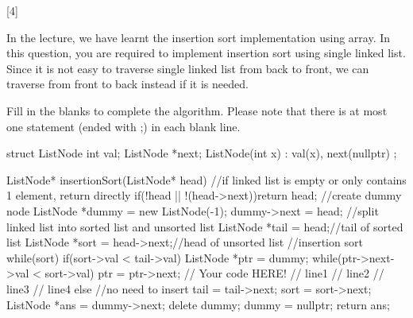 [4]

In the lecture, we have learnt the insertion sort implementation using array. In this question, you are required to implement insertion sort using single linked list. Since it is not easy to traverse single linked list from back to front, we can traverse from front to back instead if it is needed.

Fill in the blanks to complete the algorithm. Please note that there is at most one statement (ended with ;) in each blank line. 

\begin{cpp}
struct ListNode 
{
    int val;
    ListNode *next;
    ListNode(int x) : val(x), next(nullptr) {}
};
    
ListNode* insertionSort(ListNode* head) {
    //if linked list is empty or only contains 1 element, return directly
    if(!head || !(head->next)){return head;}
    //create dummy node
    ListNode *dummy = new ListNode(-1);
    dummy->next = head;
    //split linked list into sorted list and unsorted list
    ListNode *tail = head;//tail of sorted list
    ListNode *sort = head->next;//head of unsorted list
    //insertion sort
    while(sort)
    {
       if(sort->val < tail->val)
       {
           ListNode *ptr = dummy;
           while(ptr->next->val < sort->val) ptr = ptr->next;
           // Your code HERE!
           // line1
           // line2
           // line3
           // line4
       }
       else
       {	//no need to insert
           tail = tail->next;
           sort = sort->next;
       }
    }
    ListNode *ans = dummy->next;
    delete dummy; dummy = nullptr;
    return ans;
}
\end{cpp}

\begin{solution}[3in]
    \vspace{3in}
\end{solution}